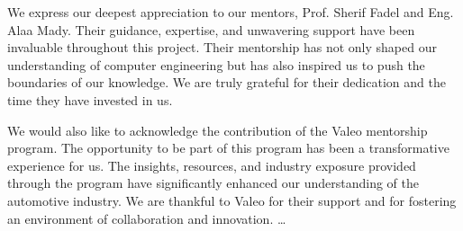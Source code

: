 \documentclass[
12pt,
oneside, 
onehalfspacing, 
nolistspacing, 
parskip, 
chapterinoneline, 
]{AASTCOMPUTER}
\author{Youssef Mohamed Abbas}
\begin{document}
\frontmatter 
\pagestyle{plain} 

\titlep

\declarationp

\examinersp



\begin{acknowledgmentsp}
We express our deepest appreciation to our mentors, Prof. Sherif Fadel and Eng. Alaa Mady. Their guidance, expertise, and unwavering support have been invaluable throughout this project. Their mentorship has not only shaped our understanding of computer engineering but has also inspired us to push the boundaries of our knowledge. We are truly grateful for their dedication and the time they have invested in us.

We would also like to acknowledge the contribution of the Valeo mentorship program. The opportunity to be part of this program has been a transformative experience for us. The insights, resources, and industry exposure provided through the program have significantly enhanced our understanding of the automotive industry. We are thankful to Valeo for their support and for fostering an environment of collaboration and innovation.
\ldots
\end{acknowledgmentsp}
\end{document}
